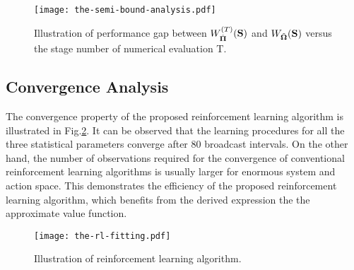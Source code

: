 \begin{figure}[ht!]                                                                             %
    \centering                                                                                  %
    \texttt{[image: the-semi-bound-analysis.pdf]}                     %
    \caption{Illustration of performance gap between $W^{(T)}_{\hat{\boldsymbol{\Pi}}}(\mathbf{S})$ and $W_{\tilde{\boldsymbol{\Omega}}}(\mathbf{S})$ versus the stage number of numerical evaluation T.}
    \label{fig:semi-bound}                                                                %
\end{figure}                                                                                    %

\subsection{Convergence Analysis}
\label{subsec:converge}
The convergence property of the proposed reinforcement learning algorithm is illustrated in Fig.\ref{fig:rl_plot}.
It can be observed that the learning procedures for all the three statistical parameters converge after $80$ broadcast intervals.
On the other hand, the number of observations required for the convergence of conventional reinforcement learning algorithms is usually larger for enormous system and action space.
This demonstrates the efficiency of the proposed reinforcement learning algorithm, which benefits from the derived expression the the approximate value function.
\begin{figure}[ht!]
    \centering
    \texttt{[image: the-rl-fitting.pdf]}
    \caption{Illustration of reinforcement learning algorithm.} 
    \label{fig:rl_plot}
\end{figure}


